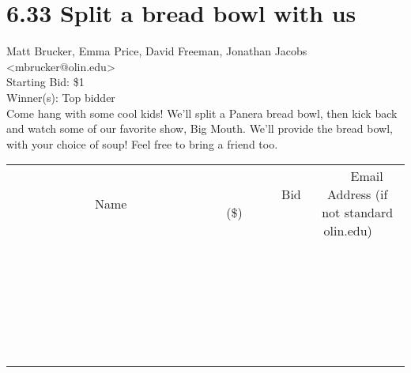 \documentclass[11pt]{article}
\begin{document}
					\section*{6.33 Split a bread bowl with us}
					Matt Brucker, Emma Price, David Freeman, Jonathan Jacobs <mbrucker@olin.edu> \\
					Starting Bid: \$1 \\
					Winner(s): Top bidder \\
					Come hang with some cool kids! We'll split a Panera bread bowl, then kick back and watch some of our favorite show, Big Mouth. We'll provide the bread bowl, with your choice of soup! Feel free to bring a friend too. \\
					[6ex]
					\begin{tabular}{c c c}
						~~~~~~~~~~~~~Name~~~~~~~~~~~~~ & ~~~~~~~~~Bid (\$)~~~~~~~~~ & ~~~Email Address (if not standard olin.edu)~~~ \\
				
 & & \\
\hline
 & & \\
\hline
 & & \\
\hline
 & & \\
\hline
 & & \\
\hline
 & & \\
\hline
 & & \\
\hline
 & & \\
\hline
 & & \\
\hline
 & & \\
\hline
 & & \\
\hline
 & & \\
\hline
 & & \\
\hline
 & & \\
\hline
 & & \\
\hline
 & & \\
\hline
 & & \\
\hline
 & & \\
\hline
 & & \\
\hline
 & & \\
\hline
 & & \\
\hline
 & & \\
\hline
 & & \\
\hline
 & & \\
\hline
 & & \\
\hline
 & & \\
\hline
					\end{tabular}
					\clearpage
				
\end{document}
